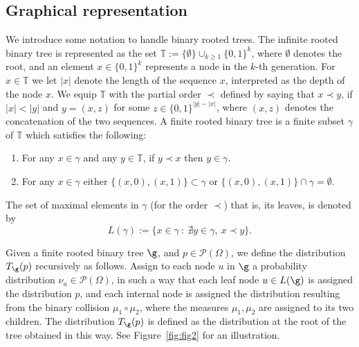 \documentclass[11pt,reqno]{amsart}
\numberwithin{equation}{section}
\numberwithin{figure}{section}
\newcommand{\1}{\mathds{1}}
\let\O=\Omega
\newcommand{\cP}{\ensuremath{\mathcal P}}
\newcommand{\bbT}{{\ensuremath{\mathbb T}} }
\begin{document}
\subsection{Graphical representation}
% 
We introduce some notation to handle binary rooted trees. 
The infinite rooted binary tree is represented as the set $\mathbb T:=\{\emptyset\} \cup_{k\ge 1} \{0,1\}^k$, where $\emptyset$ denotes the root, and an element $x\in\{0,1\}^k$ represents a node in the $k$-th generation. 
 For $x\in \bbT$ we let $|x|$ denote the length of the sequence $x$, interpreted as the depth of the node $x$.
 We equip $\mathbb T$ with the partial order $\prec$ defined by saying that $x \prec y$, if $|x| < |y|$ and $y=(x,z)$ for some $z\in \{0,1\}^{|y|-|x|}$, where  $(x,z)$ denotes the concatenation of the two sequences. A finite rooted binary tree is a finite subset $\gamma$ of $\mathbb T$ which satisfies the following:
\begin{enumerate}
		\item For any $x\in \gamma$ and any $y\in \mathbb{T}$, if $y \prec x$ then $y\in \gamma$.
		\item For any $x\in \gamma$ either $\{(x,0),(x,1)\}\subset \gamma$ or $\{(x,0),(x,1)\}\cap \gamma=\emptyset$.
	\end{enumerate}
	The set of maximal elements in $\gamma$ (for the order $\prec$) that is, its leaves, is denoted by
	\begin{equation}\label{leaf}
	L(\gamma):= \{ x\in \gamma \ : \ \nexists y\in \gamma, \  x \prec y\}.
	\end{equation}


Given a  finite rooted binary tree  $\g$, and $p\in \cP(\O)$, we define the distribution \( T_\g(p) \) recursively as follows. Assign to each node \( u \) in \( \g \) a probability distribution \( \nu_u \in \cP(\O) \), in such a way that each leaf node $u\in L(\g)$ is assigned the distribution \( p \), and each internal node is assigned the distribution resulting from the binary collision $\mu_1\circ\mu_2$, where the measures $\mu_1,\mu_2$ are assigned to its two children. The distribution \( T_\g(p) \) is defined as the distribution at the root of the tree obtained in this way. See Figure~\ref{fig:fig2} for an illustration.
\end{document}
